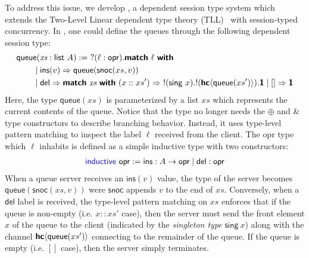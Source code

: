 To address this issue, we develop \TLLC{}, a dependent session type system which
extends the Two-Level Linear dependent type theory (TLL)~\cite{fu23} with
session-typed concurrency. In \TLLC{}, one could define the queues through the following
dependent session type:
\begin{alignat*}{2}
  &\textsf{queue} (\textit{xs} : \textsf{list}\ A) :=\ ?(\ell : \textsf{opr}). \textbf{\textsf{match}}\ \ell\ \textbf{\textsf{with}} \\
  &\qquad\mid \textsf{ins}(v) \Rightarrow \textsf{queue}(\textsf{snoc}(xs, v)) \\
  &\qquad\mid \textsf{del} \Rightarrow
    \textbf{\textsf{match}}\ \textit{xs}\ \textbf{\textsf{with}}
    \ (x :: xs') \Rightarrow\ !(\textsf{sing}\ x). !({\textbf{\textsf{hc}}\langle{\textsf{queue}(xs')}\rangle}). \textbf{\textsf{1}}
    \mid [] \Rightarrow \textbf{\textsf{1}}
\end{alignat*}
Here, the type $\textsf{queue}(\textit{xs})$ is parameterized by a list $\textit{xs}$
which represents the current contents of the queue. Notice that the type no longer needs
the $\oplus$ and $\&$ type constructors to describe branching behavior. Instead, it uses
type-level pattern matching to inspect the label $\ell$ received from the client.
The \textsf{opr} type which $\ell$ inhabits is defined as a simple inductive type with
two constructors:
\begin{align*}
  \textsf{\color{blue}inductive}\ \textsf{opr} := \textsf{ins}: A \rightarrow \textsf{opr} \mid \textsf{del}: \textsf{opr}
\end{align*}
When a queue server receives an $\textsf{ins}(v)$ value, the type of the server becomes
$\textsf{queue}(\textsf{snoc}(xs, v))$ were $\textsf{snoc}$ appends $v$ to the end of $xs$.
Conversely, when a $\textsf{del}$ label is received, the type-level pattern matching on $xs$
enforces that if the queue is non-empty (i.e. $x :: xs'$ case), then the server must send
the front element $x$ of the queue to the client (indicated by the \emph{singleton type}
$\textsf{sing}\ x$) along with the channel ${\textbf{\textsf{hc}}\langle{\textsf{queue}(xs')}\rangle}$ connecting to the remainder
of the queue. If the queue is empty (i.e. $[]$ case), then the server simply terminates.

